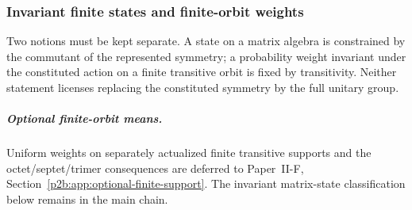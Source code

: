 \documentclass[12pt,a4paper]{article}
\begin{document}
\subsubsection{Invariant finite states and finite-orbit weights}
\label{p2:subsec:finite-carrier-trace-weight-closure}

Two notions must be kept separate.  A state on a matrix algebra is constrained
by the commutant of the represented symmetry; a probability weight invariant
under the constituted action on a finite transitive orbit is fixed by
transitivity.  Neither statement licenses replacing the constituted symmetry
by the full unitary group.

\subparagraph{Optional finite-orbit means.}
Uniform weights on separately actualized finite transitive supports and the
octet/septet/trimer consequences are deferred to
Paper~II-F, Section~\ref{p2b:app:optional-finite-support}.  The invariant matrix-state
classification below remains in the main chain.
\end{document}
